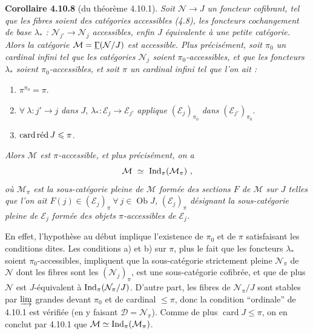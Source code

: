 \textbf{Corollaire 4.10.8} (du théorème 4.10.1). \textit{Soit $\mathcal{N} \longrightarrow J$ un foncteur cofibrant, tel que les fibres soient des catégories accessibles (4.8), les foncteurs cochangement de base $\lambda_*$ : $\mathcal{N}_{j'} \longrightarrow \mathcal{N}_j$ accessibles, enfin $J$ équivalente à une petite catégorie. Alors la catégorie $\mathcal{M} = \uGamma(\mathcal{N}/J)$ est accessible. Plus précisément, soit $\pi_0$ un cardinal infini tel que les catégories $\mathcal{N}_j$ soient $\pi_0$-accessibles, et que les foncteurs $\lambda_*$ soient $\pi_0$-accessibles, et soit $\pi$ un cardinal infini tel que l'on ait :}
\begin{enumerate}[leftmargin=*]
\item[\cercle{a}] $\pi^{\pi_0} = \pi$.
\item[\cercle{b}] $\forall\ \lambda : j' \longrightarrow j$ \textit{dans} $J$, $\lambda_* : \mathcal{E}_j \longrightarrow \mathcal{E}_{j'}$ \textit{applique} $(\mathcal{E}_j)_{\pi_0}$ \textit{dans} $(\mathcal{E}_{j'})_{\pi_0}$.
\item[\cercle{c}] $\cardred J \leqslant \pi$.
\end{enumerate}
\textit{Alors $\mathcal{M}$ est $\pi$-accessible, et plus précisément, on a}
\[
\mathcal{M} \ \simeq \ \Ind_\pi(\mathcal{M}_\pi) \ ,
\]
\textit{où $\mathcal{M}_\pi$ est la sous-catégorie pleine de $\mathcal{M}$ formée des sections $F$ de $\mathcal{M}$ sur $J$ telles que l'on ait $F(j) \in (\mathcal{E}_j)_\pi \ \forall\ j \in \operatorname{Ob} J$,}  \textit{$(\mathcal{E}_j)_\pi$ désignant la sous-catégorie pleine de $\mathcal{E}_j$ formée des objets $\pi$-accessibles de $\mathcal{E}_j$.}

En effet, l'hypothèse au début implique l'existence de $\pi_0$ et de $\pi$ satisfaisant les conditions dites. Les conditions a) et b) sur $\pi$, plus le fait que les foncteurs $\lambda_*$ soient $\pi_0$-accessibles, impliquent que la sous-catégorie strictement pleine $\mathcal{N}_\pi$ de $\mathcal{N}$ dont les fibres sont les $(\mathcal{N}_j)_\pi$, est une sous-catégorie cofibrée, et que de plus $\mathcal{N}$ est $J$-équivalent à $\Ind_\pi(\mathcal{N}_\pi/J)$. D'autre part, les fibres de $\mathcal{N}_\pi/J$ sont stables par $\varinjlim$ grandes devant $\pi_0$ et de cardinal $\leqslant \pi$, donc la condition “ordinale” de 4.10.1 est vérifiée (en y faisant $\mathcal{D} = \mathcal{N}_\pi$). Comme de plus $\operatorname{card} J \leqslant \pi$, on en conclut par 4.10.1 que $\mathcal{M} \simeq \Ind_\pi(\mathcal{M}_\pi)$.

